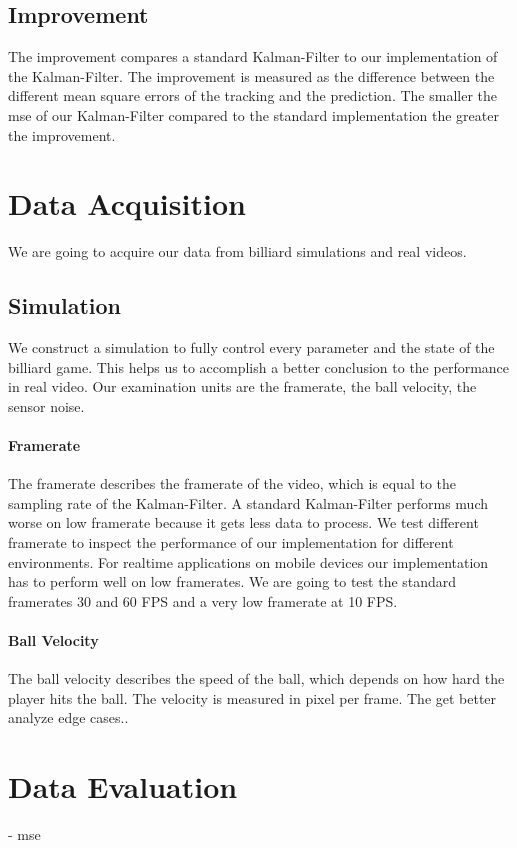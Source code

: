 \documentclass[titlepage, a4paper, 11pt]{scrartcl}
\begin{document}
\subsection{Improvement}

The improvement compares a standard Kalman-Filter to our implementation of the Kalman-Filter.
The improvement is measured as the difference between the different mean square errors of the tracking and the prediction.
The smaller the mse of our Kalman-Filter compared to the standard implementation the greater the improvement.

\section{Data Acquisition}

We are going to acquire our data from billiard simulations and real videos.

\subsection{Simulation}

We construct a simulation to fully control every parameter and the state of the billiard game.
This helps us to accomplish a better conclusion to the performance in real video.
Our examination units are the framerate, the ball velocity, the sensor noise.

\paragraph{Framerate}

The framerate describes the framerate of the video, which is equal to the sampling rate of the Kalman-Filter.
A standard Kalman-Filter performs much worse on low framerate because it gets less data to process.
We test different framerate to inspect the performance of our implementation for different environments.
For realtime applications on mobile devices our implementation has to perform well on low framerates.
We are going to test the standard framerates 30 and 60 FPS and a very low framerate at 10 FPS.

\paragraph{Ball Velocity}

The ball velocity describes the speed of the ball, which depends on how hard the player hits the ball.
The velocity is measured in pixel per frame.
The get better analyze edge cases..

\section{Data Evaluation}

- mse

 

\end{document}
